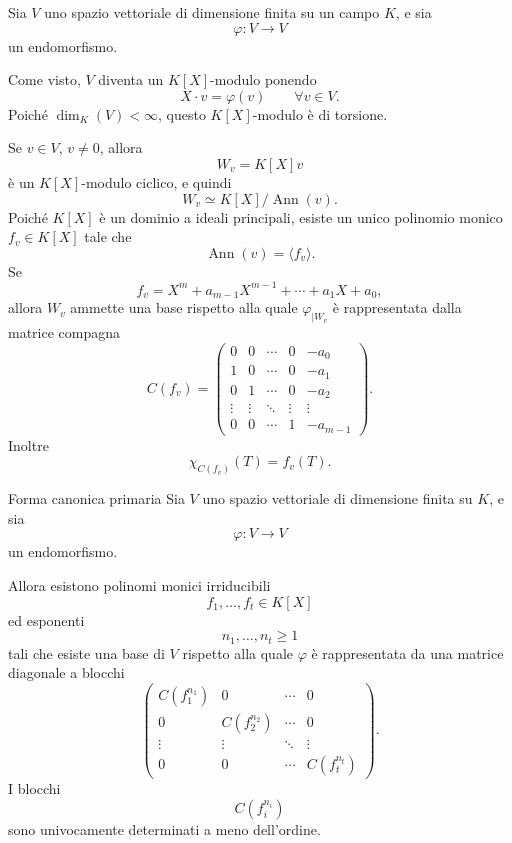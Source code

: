 \documentclass[a4paper]{article}
\begin{document}
\begin{radioactive}
Sia \(V\) uno spazio vettoriale di dimensione finita su un campo \(K\), e sia
\[
    \varphi\colon V\to V
\]
un endomorfismo.

Come visto, \(V\) diventa un \(K[X]\)-modulo ponendo
\[
    X\cdot v=\varphi(v)
    \qquad
    \forall v\in V.
\]
Poiché \(\dim_K(V)<\infty\), questo \(K[X]\)-modulo è di torsione.

Se \(v\in V\), \(v\neq 0\), allora
\[
    W_v=K[X]v
\]
è un \(K[X]\)-modulo ciclico, e quindi
\[
    W_v\simeq K[X]/\operatorname{Ann}(v).
\]
Poiché \(K[X]\) è un dominio a ideali principali, esiste un unico polinomio monico \(f_v\in K[X]\) tale che
\[
    \operatorname{Ann}(v)=\langle f_v \rangle.
\]
Se
\[
    f_v=X^m+a_{m-1}X^{m-1}+\cdots+a_1X+a_0,
\]
allora \(W_v\) ammette una base rispetto alla quale \(\varphi_{|W_v}\) è rappresentata dalla matrice compagna
\[
    C(f_v)
    =
    \begin{pmatrix}
        0 & 0 & \cdots & 0 & -a_0\\
        1 & 0 & \cdots & 0 & -a_1\\
        0 & 1 & \cdots & 0 & -a_2\\
        \vdots & \vdots & \ddots & \vdots & \vdots\\
        0 & 0 & \cdots & 1 & -a_{m-1}
    \end{pmatrix}.
\]
Inoltre
\[
    \chi_{C(f_v)}(T)=f_v(T).
\]
\end{radioactive}

\begin{radioactive}
\begin{snippettheorem}{Forma canonica primaria}
    Sia \(V\) uno spazio vettoriale di dimensione finita su \(K\), e sia
    \[
        \varphi\colon V\to V
    \]
    un endomorfismo.

    Allora esistono polinomi monici irriducibili
    \[
        f_1,\ldots,f_t\in K[X]
    \]
    ed esponenti
    \[
        n_1,\ldots,n_t\geq 1
    \]
    tali che esiste una base di \(V\) rispetto alla quale \(\varphi\) è rappresentata da una matrice diagonale a blocchi
    \[
        \begin{pmatrix}
            C(f_1^{n_1}) & 0 & \cdots & 0\\
            0 & C(f_2^{n_2}) & \cdots & 0\\
            \vdots & \vdots & \ddots & \vdots\\
            0 & 0 & \cdots & C(f_t^{n_t})
        \end{pmatrix}.
    \]
    I blocchi
    \[
        C(f_i^{n_i})
    \]
    sono univocamente determinati a meno dell'ordine.
\end{snippettheorem}
\end{radioactive}
\end{document}
